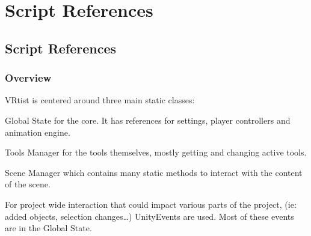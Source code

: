 \documentclass[letterpaper,10pt,english,openany,oneside]{sphinxmanual}
\let\sphinxpxdimen\pdfpxdimen\else\newdimen\sphinxpxdimen
\begin{document}
\chapter{Script References}
\label{\detokenize{index:script-references}}

\section{Script References}
\label{\detokenize{ScriptReferences/Script:script-references}}\label{\detokenize{ScriptReferences/Script::doc}}

\subsection{Overview}
\label{\detokenize{ScriptReferences/Script:overview}}
\begin{DUlineblock}{0em}
\item[] VRtist is centered around three main static classes:
\item[] Global State for the core. It has references for settings, player controllers and animation engine.
\item[] Tools Manager for the tools themselves, mostly getting and changing active tools.
\item[] Scene Manager which contains many static methods to interact with the content of the scene.
\item[] 
\item[] For project wide interaction that could impact various parts of the project, (ie: added objects, selection changes…) UnityEvents are used. Most of these events are in the Global State.
\item[] 
\end{DUlineblock}

\noindent{\hspace*{\fill}\sphinxincludegraphics[width=700\sphinxpxdimen]{{Diagrame}.png}\hspace*{\fill}}

\begin{DUlineblock}{0em}
\item[] 
\end{DUlineblock}
\end{document}
